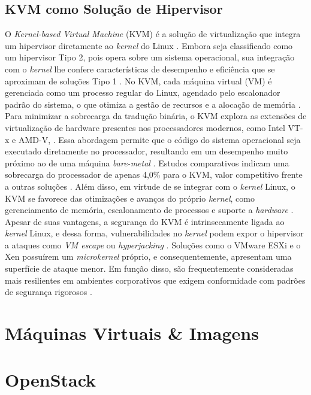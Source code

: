 \subsection{KVM como Solução de Hipervisor}

O \textit{Kernel-based Virtual Machine} (KVM) é a solução de virtualização que integra um hipervisor diretamente ao \textit{kernel} do Linux \cite{carissimi2008}. Embora seja classificado como um hipervisor Tipo 2, pois opera sobre um sistema operacional, sua integração com o \textit{kernel} lhe confere características de desempenho e eficiência que se aproximam de soluções Tipo 1 \cite{chawla2025, kominos2017}. No KVM, cada máquina virtual (VM) é gerenciada como um processo regular do Linux, agendado pelo escalonador padrão do sistema, o que otimiza a gestão de recursos e a alocação de memória \cite{anand2013}.
Para minimizar a sobrecarga da tradução binária, o KVM explora as extensões de virtualização de hardware presentes nos processadores modernos, como Intel VT-x e AMD-V, \cite{chawla2025, carissimi2008}. Essa abordagem permite que o código do sistema operacional seja executado diretamente no processador, resultando em um desempenho muito próximo ao de uma máquina \textit{bare-metal} \cite{kominos2017}. Estudos comparativos indicam uma sobrecarga do processador de apenas 4,0\% para o KVM, valor competitivo frente a outras soluções \cite{chawla2025}. Além disso, em virtude de se integrar com o \textit{kernel} Linux, o KVM se favorece das otimizações e avanços do próprio \textit{kernel}, como gerenciamento de memória, escalonamento de processos e suporte a \textit{hardware} \cite{anand2013, arora2014}. 
Apesar de suas vantagens, a segurança do KVM é intrinsecamente ligada ao \textit{kernel} Linux, e dessa forma, vulnerabilidades no \textit{kernel} podem expor o hipervisor a ataques como \textit{VM escape} ou \textit{hyperjacking} \cite{chawla2025}. Soluções como o VMware ESXi e o Xen possuírem um \textit{microkernel} próprio, e consequentemente, apresentam uma superfície de ataque menor. Em função disso, são frequentemente consideradas mais resilientes em ambientes corporativos que exigem conformidade com padrões de segurança rigorosos \cite{chawla2025}.

\section{Máquinas Virtuais \& Imagens}
\label{sec:máquinas-virtuais}

\section{OpenStack}


